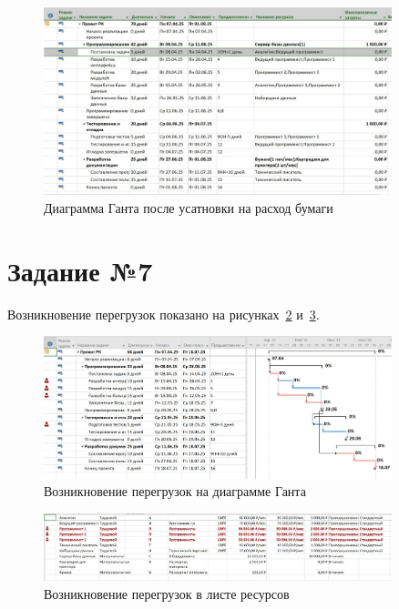 \begin{figure}[H]
	\centering
	\includegraphics[width=0.9\textwidth]{img/task6/screen6_4.jpg}
	\caption{Диаграмма Ганта после усатновки на расход бумаги}
	\label{fig:paper1}
\end{figure}

\section{Задание №7}

Возникновение перегрузок показано на рисунках~\ref{fig:screen7_1} и~\ref{fig:screen7_2}.

\begin{figure}[H]
	\centering
	\includegraphics[width=0.9\textwidth]{img/task7/screen7_3.jpg}
	\caption{Возникновение перегрузок на диаграмме Ганта}
	\label{fig:screen7_1}
\end{figure}

\begin{figure}[H]
	\centering
	\includegraphics[width=0.9\textwidth]{img/task7/screen7_2.jpg}
	\caption{Возникновение перегрузок в листе ресурсов}
	\label{fig:screen7_2}
\end{figure}

